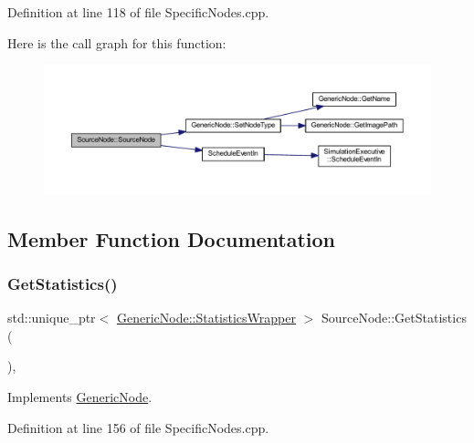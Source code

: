Definition at line 118 of file Specific\+Nodes.\+cpp.

Here is the call graph for this function\+:
\nopagebreak
\begin{figure}[H]
\begin{center}
\leavevmode
\includegraphics[width=350pt]{class_source_node_ab287553b2a359c578f4579bd467806a2_cgraph}
\end{center}
\end{figure}


\subsection{Member Function Documentation}
\mbox{\label{class_source_node_a0aea882fe808d9da6d506653be166e73}} 
\subsubsection{\texorpdfstring{Get\+Statistics()}{GetStatistics()}}
{\footnotesize\ttfamily std\+::unique\+\_\+ptr$<$ \hyperlink{class_generic_node_1_1_statistics_wrapper}{Generic\+Node\+::\+Statistics\+Wrapper} $>$ Source\+Node\+::\+Get\+Statistics (\begin{DoxyParamCaption}{ }\end{DoxyParamCaption})\hspace{0.3cm}{\ttfamily [override]}, {\ttfamily [virtual]}}



Implements \hyperlink{class_generic_node_ae7c8424c8c14fd3de993c902d78deb67}{Generic\+Node}.



Definition at line 156 of file Specific\+Nodes.\+cpp.

